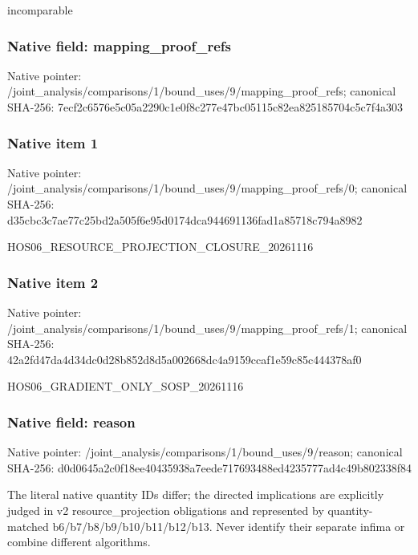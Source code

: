 \documentclass[10pt,a4paper]{article}
\begin{document}
\begingroup\raggedright\sloppy incomparable\par\endgroup

\subsubsection{Native field: mapping\_\allowbreak{}proof\_\allowbreak{}refs}
Native pointer: /joint\_\allowbreak{}analysis/comparisons/1/bound\_\allowbreak{}uses/9/mapping\_\allowbreak{}proof\_\allowbreak{}refs; canonical SHA-256: 7ecf2c6576e5c05a2290c1e0f8c277e47bc05115c82ea825185704c5c7f4a303

\subsubsection{Native item 1}
Native pointer: /joint\_\allowbreak{}analysis/comparisons/1/bound\_\allowbreak{}uses/9/mapping\_\allowbreak{}proof\_\allowbreak{}refs/0; canonical SHA-256: d35cbc3c7ae77c25bd2a505f6e95d0174dca944691136fad1a85718c794a8982

\begingroup\raggedright\sloppy HOS06\_\allowbreak{}RESOURCE\_\allowbreak{}PROJECTION\_\allowbreak{}CLOSURE\_\allowbreak{}20261116\par\endgroup

\subsubsection{Native item 2}
Native pointer: /joint\_\allowbreak{}analysis/comparisons/1/bound\_\allowbreak{}uses/9/mapping\_\allowbreak{}proof\_\allowbreak{}refs/1; canonical SHA-256: 42a2fd47da4d34dc0d28b852d8d5a002668dc4a9159ccaf1e59c85c444378af0

\begingroup\raggedright\sloppy HOS06\_\allowbreak{}GRADIENT\_\allowbreak{}ONLY\_\allowbreak{}SOSP\_\allowbreak{}20261116\par\endgroup

\subsubsection{Native field: reason}
Native pointer: /joint\_\allowbreak{}analysis/comparisons/1/bound\_\allowbreak{}uses/9/reason; canonical SHA-256: d0d0645a2c0f18ee40435938a7eede717693488ed4235777ad4c49b802338f84

\begingroup\raggedright\sloppy The literal native quantity IDs differ;\allowbreak{} the directed implications are explicitly judged in v2 resource\_\allowbreak{}projection obligations and represented by quantity-matched b6/\allowbreak{}b7/\allowbreak{}b8/\allowbreak{}b9/\allowbreak{}b10/\allowbreak{}b11/\allowbreak{}b12/\allowbreak{}b13. Never identify their separate infima or combine different algorithms.\par\endgroup
\end{document}
